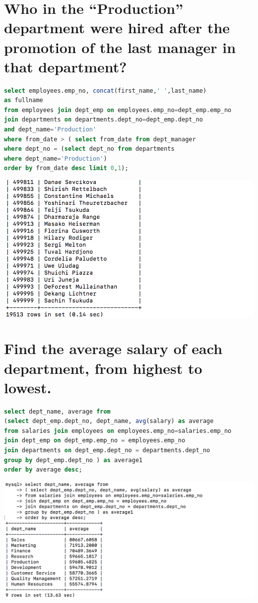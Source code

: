 \documentclass{article}
\begin{document}
\section{Who in the “Production” department were hired after the promotion of the last manager in that department?}
\begin{lstlisting}[language=sql]
select employees.emp_no, concat(first_name,' ',last_name)
as fullname
from employees join dept_emp on employees.emp_no=dept_emp.emp_no 
join departments on departments.dept_no=dept_emp.dept_no 
and dept_name='Production'
where from_date > ( select from_date from dept_manager 
where dept_no = (select dept_no from departments 
where dept_name='Production') 
order by from_date desc limit 0,1);
\end{lstlisting}
\includegraphics[width=\linewidth]{2.png}

\section{Find the average salary of each department, from highest to lowest.}
\begin{lstlisting}[language=sql]
select dept_name, average from 
(select dept_emp.dept_no, dept_name, avg(salary) as average 
from salaries join employees on employees.emp_no=salaries.emp_no 
join dept_emp on dept_emp.emp_no = employees.emp_no
join departments on dept_emp.dept_no = departments.dept_no
group by dept_emp.dept_no ) as average1
order by average desc;
\end{lstlisting}
\includegraphics[width=\linewidth]{3.png}
\end{document}
